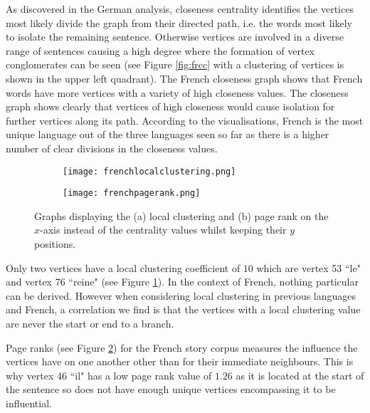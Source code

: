 As discovered in the German analysis, closeness centrality identifies the vertices most likely divide the graph from their directed path, i.e. the words most likely to isolate the remaining sentence. Otherwise vertices are involved in a diverse range of sentences causing a high degree where the formation of vertex conglomerates can be seen (see Figure \ref{fig:frcc} with a clustering of vertices is shown in the upper left quadrant). The French closeness graph shows that French words have more vertices with a variety of high closeness values. The closeness graph shows clearly that vertices of high closeness would cause isolation for further vertices along its path. According to the visualisations, French is the most unique language out of the three languages seen so far as there is a higher number of clear divisions in the closeness values.

\begin{figure}[!htb]
\centering
\begin{subfigure}{.45\textwidth}
	\hspace{-1cm} 
	\texttt{[image: frenchlocalclustering.png]}
	\caption{}
	\label{fig:frlc}
\end{subfigure}
\hfill
\begin{subfigure}{.45\textwidth}
	\hspace{-1cm} 
	\texttt{[image: frenchpagerank.png]}
	\caption{}
	\label{fig:frpr}
\end{subfigure}
\caption{Graphs displaying the (a) local clustering and (b) page rank on the $x$-axis instead of the centrality values whilst keeping their $y$ positions.}
\label{fig:frother}
\end{figure}

Only two vertices have a local clustering coefficient of $10$ which are vertex 53 ``le" and vertex 76 ``reine" (see Figure \ref{fig:frlc}). In the context of French, nothing particular can be derived. However when considering local clustering in previous languages and French, a correlation we find is that the vertices with a local clustering value are never the start or end to a branch.

Page ranks (see Figure \ref{fig:frpr}) for the French story corpus measures the influence the vertices have on one another other than for their immediate neighbours. This is why vertex 46 ``il" has a low page rank value of $1.26$ as it is located at the start of the sentence so does not have enough unique vertices encompassing it to be influential.

